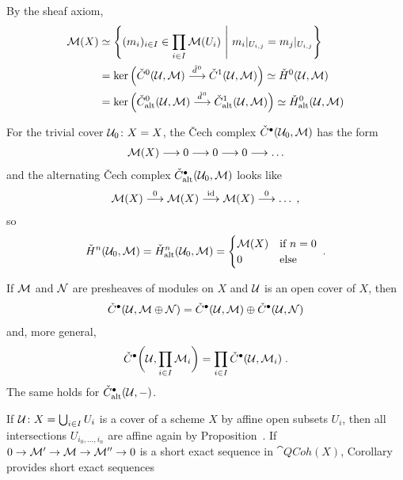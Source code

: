 \documentclass[a4paper,parskip=half,numbers=enddot, DIV=12]{scrreprt}
\newcommand{\vC}{\v{C}}
\begin{document}
\begin{example}
	\begin{alphanumerate}
		\item {}By the sheaf axiom, 
		\begin{align*}
			\Mm(X)&\simeq\left\{(m_i)_{i\in I}\in\prod_{i\in I}\Mm(U_i)\st m_i|_{U_{i,j}}=m_j|_{U_{i,j}}\right\}\\
			&=\ker\Big(\check{C}^0(\Uu,\Mm)\morphism[\hacek{d}^0]\check{C}^1(\Uu,\Mm)\Big)\simeq \check{H}^0(\Uu,\Mm)\\
			&=\ker\Big(\check{C}_\alt^0(\Uu,\Mm)\morphism[\hacek{d}^0]\check{C}_\alt^1(\Uu,\Mm)\Big)\simeq \check{H}_\alt^0(\Uu,\Mm)
		\end{align*}
		\item For the trivial cover $\mathcal{U}_0\colon X=X$, the \vC ech complex $\check{C}^\bullet (\mathcal{U}_0,\mathcal{M})$ has the form
		\begin{align*}
			\Mm(X)\morphism 0\morphism 0\morphism0\morphism\ldots
		\end{align*}
		and the alternating \vC ech complex $\check{C}_{\mathrm{alt}}^\bullet (\mathcal{U}_0,\mathcal{M})$ looks like
		\begin{align*}
			\Mm(X)\morphism[0]\Mm(X)\morphism[\id]\Mm(X)\morphism[0]\ldots\;,
		\end{align*}
		so
		\begin{align*}
			\check{H}^n(\mathcal{U}_0,\mathcal{M})=\check{H}_{\mathrm{alt}}^n(\mathcal{U}_0,\mathcal{M})=\begin{cases}
				\mathcal{M}(X) & \text{if }n=0\\
				0 & \text{else}
			\end{cases}\;.
		\end{align*}
		\item If $\mathcal{M}$ and $\mathcal{N}$ are presheaves of modules on $X$ and $\mathcal{U}$ is an open cover of $X$, then 
		\begin{align*}
			\check{C}^\bullet (\mathcal{U},\mathcal{M}\oplus\mathcal{N})=\check{C}^\bullet (\mathcal{U},\mathcal{M})\oplus\check{C}^\bullet (\mathcal{U},\mathcal{N})
		\end{align*}
		and, more general, 
		\begin{align*}
			\check{C}^\bullet \bigg(\mathcal{U},\prod_{i\in I}\mathcal{M}_i\bigg)=\prod_{i\in I}\check{C}^\bullet (\mathcal{U},\mathcal{M}_i)\;.
		\end{align*}
		The same holds for $\check{C}_{\mathrm{alt}}^\bullet (\mathcal{U},-)$.
	\end{alphanumerate}
\end{example}
If $\mathcal{U}\colon X=\bigcup_{i\in I}U_i$ is a cover of a scheme $X$ by affine open subsets $U_i$, then all intersections $U_{i_0,\ldots,i_n}$ are affine again by Proposition~. If $0\morphism\Mm'\morphism\Mm\morphism\Mm''\morphism 0$ is a short exact sequence in $\cat{QCoh}(X)$, Corollary~ provides short exact sequences
\end{document}
